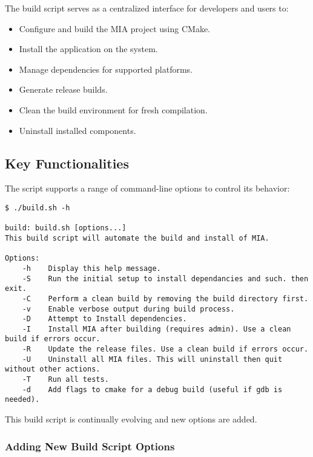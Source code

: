 The build script serves as a centralized interface for developers and users to:
\begin{itemize}
	\item Configure and build the MIA project using CMake.
	\item Install the application on the system.
	\item Manage dependencies for supported platforms.
	\item Generate release builds.
	\item Clean the build environment for fresh compilation.
	\item Uninstall installed components.
\end{itemize}

\subsection{Key Functionalities}

The script supports a range of command-line options to control its behavior:
\begin{lstlisting}[style=terminalstyle]
$ ./build.sh -h

build: build.sh [options...]
This build script will automate the build and install of MIA.

Options:
    -h    Display this help message.
	-S    Run the initial setup to install dependancies and such. then exit.
	-C    Perform a clean build by removing the build directory first.
	-v    Enable verbose output during build process.
	-D    Attempt to Install dependencies.
	-I    Install MIA after building (requires admin). Use a clean build if errors occur.
	-R    Update the release files. Use a clean build if errors occur.
	-U    Uninstall all MIA files. This will uninstall then quit without other actions.
	-T    Run all tests.
	-d    Add flags to cmake for a debug build (useful if gdb is needed).
\end{lstlisting}
This build script is continually evolving and new options are added.

\subsubsection{Adding New Build Script Options}

